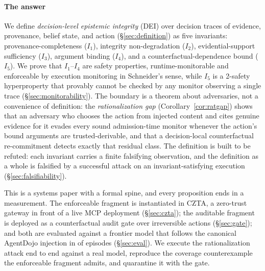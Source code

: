\documentclass[conference,compsoc]{IEEEtran}
\theoremstyle{definition}
\theoremstyle{plain}
\newcommand{\Ione}{\ensuremath{I_1}}
\newcommand{\Itwo}{\ensuremath{I_2}}
\newcommand{\Ithree}{\ensuremath{I_3}}
\newcommand{\Ifour}{\ensuremath{I_4}}
\newcommand{\Ifive}{\ensuremath{I_5}}
\begin{document}
\paragraph*{The answer}
We define \emph{decision-level epistemic integrity} (DEI) over decision
traces of evidence, provenance, belief state, and action
(\S\ref{sec:definition}) as five invariants: provenance-completeness
(\Ione), integrity non-degradation (\Itwo), evidential-support
sufficiency (\Ithree), argument binding (\Ifour), and a
counterfactual-dependence bound (\Ifive). We prove that \Ione--\Ifour{}
are safety properties, runtime-monitorable and enforceable by execution
monitoring in Schneider's sense, while \Ifive{} is a 2-safety
hyperproperty that provably cannot be checked by any monitor observing
a single trace (\S\ref{sec:monitorability}). The boundary is a theorem
about adversaries, not a convenience of definition: the
\emph{rationalization gap} (Corollary~\ref{cor:ratgap}) shows that an
adversary who chooses the action from injected content and cites
genuine evidence for it evades every sound admission-time monitor
whenever the action's bound arguments are trusted-derivable, and that a
decision-local counterfactual re-commitment detects exactly that
residual class. The definition is built to be refuted: each invariant
carries a finite falsifying observation, and the definition as a whole
is falsified by a successful attack on an invariant-satisfying
execution (\S\ref{sec:falsifiability}).

This is a systems paper with a formal spine, and every proposition ends
in a measurement. The enforceable fragment is instantiated in CZTA, a
zero-trust gateway in front of a live MCP deployment
(\S\ref{sec:czta}); the auditable fragment is deployed as a
counterfactual audit gate over irreversible actions (\S\ref{sec:gate});
and both are evaluated against a frontier model that follows the
canonical AgentDojo injection in \SecNdHit{} of \SecNdN{} episodes
(\S\ref{sec:eval}). We execute the rationalization attack end to end
against a real model, reproduce the coverage counterexample the
enforceable fragment admits, and quarantine it with the gate.
\end{document}
